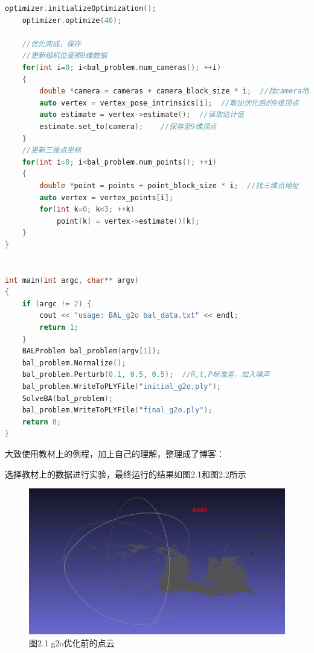 \documentclass[40pt,a4paper，UTF8]{ctexart}
\numberwithin{equation}{section}
\begin{document}
\begin{lstlisting}[language=C++, caption=BAL\_g2o核心代码]
    optimizer.initializeOptimization();
    optimizer.optimize(40);

    //优化完成，保存
    //更新相机位姿那9维数据
    for(int i=0; i<bal_problem.num_cameras(); ++i)
    {
        double *camera = cameras + camera_block_size * i;  //找camera地址
        auto vertex = vertex_pose_intrinsics[i];  //取出优化后的9维顶点
        auto estimate = vertex->estimate();  //读取估计值
        estimate.set_to(camera);    //保存至9维顶点
    }
    //更新三维点坐标
    for(int i=0; i<bal_problem.num_points(); ++i)
    {
        double *point = points + point_block_size * i;  //找三维点地址
        auto vertex = vertex_points[i];
        for(int k=0; k<3; ++k)
            point[k] = vertex->estimate()[k];
    }
}


int main(int argc, char** argv)
{
    if (argc != 2) {
        cout << "usage: BAL_g2o bal_data.txt" << endl;
        return 1;
    }
    BALProblem bal_problem(argv[1]);
    bal_problem.Normalize();
    bal_problem.Perturb(0.1, 0.5, 0.5);  //R,t,P标准差，加入噪声
    bal_problem.WriteToPLYFile("initial_g2o.ply");
    SolveBA(bal_problem);
    bal_problem.WriteToPLYFile("final_g2o.ply");
    return 0;
}
\end{lstlisting}

大致使用教材上的例程，加上自己的理解，整理成了博客\cite{ref2}：

选择教材上的数据进行实验，最终运行的结果如图2.1和图2.2所示


\begin{figure}[H]
\centering
\includegraphics[width=4.8in]{ch7_2_1.jpg} {图2.1 g2o优化前的点云}
\end{figure}
\end{document}
